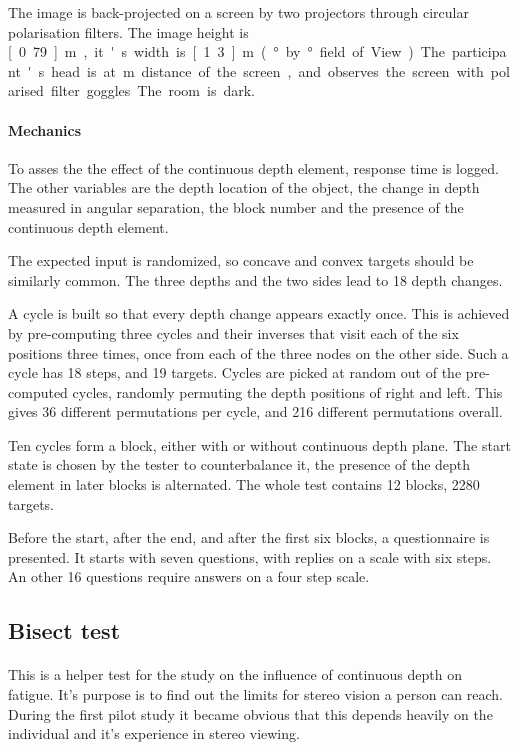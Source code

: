 The image is back-projected on a screen by two projectors through circular polarisation filters.
The image height is \unit[0.79]{m}, it's width is \unit[1.3]{m} (\unit[36]{°} by \unit[22]{°} field of View).
The participant's head is at \unit[2]{m} distance of the screen, and observes the screen with polarised filter goggles. The room is dark.

\paragraph{Mechanics}
To asses the the effect of the continuous depth element, response time is logged.
The other variables are the depth location of the object, the change in depth measured in angular separation, the block number and the presence of the continuous depth element.

The expected input is randomized, so concave and convex targets should be similarly common.
The three depths and the two sides lead to 18 depth changes.

A cycle is built so that every depth change appears exactly once.
This is achieved by pre-computing three cycles and their inverses that visit each of the six positions three times, once from each of the three nodes on the other side.
Such a cycle has 18 steps, and 19 targets.
Cycles are picked at random out of the pre-computed cycles, randomly permuting the depth positions of right and left.
This gives 36 different permutations per cycle, and 216 different permutations overall.

Ten cycles form a block, either with or without continuous depth plane.
The start state is chosen by the tester to counterbalance it, the presence of the depth element in later blocks is alternated.
The whole test contains 12 blocks, 2280 targets.

Before the start, after the end, and after the first six blocks, a questionnaire is presented.
It starts with seven questions, with replies on a scale with six steps.
An other 16 questions require answers on a four step scale.


\subsection{Bisect test}
\paragraph{}
This is a helper test for the study on the influence of continuous depth on fatigue.
It's purpose is to find out the limits for stereo vision a person can reach.
During the first pilot study it became obvious that this depends heavily on the individual and it's experience in stereo viewing.

